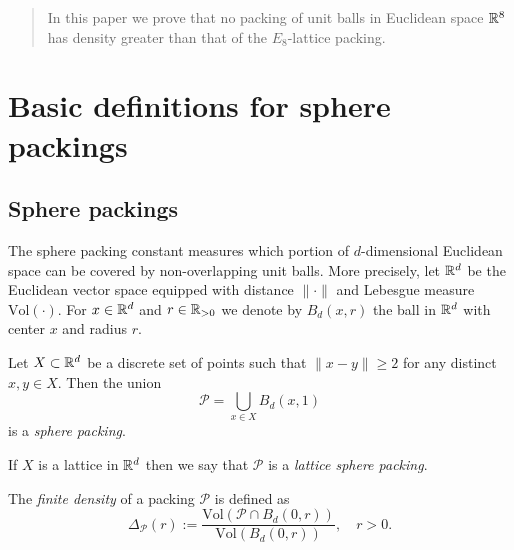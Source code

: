 %

\begin{abstract}
  In this paper we prove that no packing of unit balls
  in Euclidean space $\mathbb{R}^8$ has density greater than that of the $E_8$-lattice packing.
  \end{abstract}


  \section{Basic definitions for sphere packings}
  \subsection{Sphere packings}
  The sphere packing constant measures which portion of $d$-dimensional Euclidean
  space can be covered by non-overlapping unit balls. More precisely, let $\mathbb{R}^d$ be the Euclidean vector space equipped with distance $\|\cdot\|$ and Lebesgue measure $\mathrm{Vol}(\cdot)$. For $x\in\mathbb{R}^d$ and $r\in\mathbb{R}_{>0}$ we denote by $B_d(x,r)$ the ball in $\mathbb{R}^d$ with center $x$ and radius $r$.

  \begin{definition}Let $X\subset \mathbb{R}^d$ be a discrete set of points such that $\|x-y\|\geq2$ for any distinct $x,y\in X$. Then the union
  $$\mathcal{P}=\bigcup_{x\in X} B_d(x,1)$$ is a \emph{sphere packing}.
  \end{definition}

  \begin{definition}If $X$ is a lattice in $\mathbb{R}^d$ then we say that $\mathcal{P}$ is a \emph{lattice sphere packing}.
  \end{definition}

  \begin{definition} The \emph{finite density} of a packing $\mathcal{P}$ is defined as
  $$\Delta_{\mathcal{P}}(r):=\frac{\mathrm{Vol}(\mathcal{P}\cap B_d(0,r))}{\mathrm{Vol}(B_d(0,r))},\quad r>0.$$
  \end{definition}

